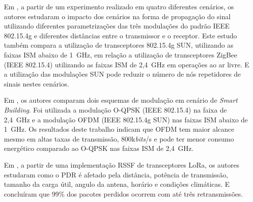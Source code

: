Em \cite{munoz2018evaluation}, a partir de um experimento realizado em quatro diferentes cenários, os autores estudaram o impacto dos cenários na forma de propagação do sinal utilizando diferentes parametrizações das três modulações do padrão IEEE 802.15.4g e diferentes distâncias entre o transmissor e o receptor. Este estudo também compara a utilização de transceptores 802.15.4g SUN, utilizando as faixas ISM abaixo de 1~GHz, em relação a utilização de transceptores ZigBee (IEEE 802.15.4) utilizando as faixas ISM de 2,4~GHz em operações ao ar livre. E a utilização das modulações SUN pode reduzir o número de nós repetidores de sinais nestes cenários.

Em  \cite{munoz2018overview}, os autores comparam dois esquemas de modulação em cenário de \emph{Smart Building}. Foi utilizada a modulação O-QPSK (IEEE 802.15.4) na faixa de 2,4~GHz e a modulação OFDM (IEEE 802.15.4g SUN) nas faixas ISM abaixo de 1~GHz. Os resultados deste trabalho indicam que OFDM tem maior alcance mesmo em altas taxas de transmissão, 800k\emph{bits}/s e pode ter menor consumo energético comparado ao O-QPSK nas faixas ISM de 2,4~GHz.

Em \cite{wang2017performance}, a partir de uma implementação RSSF de transceptores LoRa, os autores estudaram como o PDR é afetado pela distância, potência de transmissão, tamanho da carga útil, angulo da antena, horário e condições climáticas. E concluíram que 99\% dos pacotes perdidos ocorrem com até três retransmissões.

